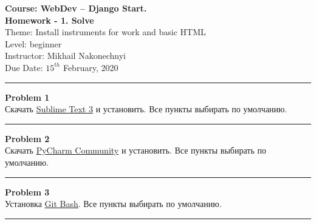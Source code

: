 \documentclass[a4paper, 11pt]{extarticle}
\newenvironment{problem}[2][Problem]
    { \begin{mdframed}[backgroundcolor=gray!20] \textbf{#1 #2} \\}
    {  \end{mdframed}}
\begin{document}

\noindent \LARGE{\textbf{Course: WebDev -- Django Start.}} \hfill  \\ 
\textbf{Homework - 1. Solve}  \hfill  \\

\noindent Theme: Install instruments for work and basic HTML\hfill  \\
Level: beginner\\
Instructor: Mikhail Nakonechnyi \\
Due Date: $15^{th}$ February, 2020 \\
\noindent\rule{6.257in}{2.8pt}

\begin{problem}{1}
Скачать \href{https://www.sublimetext.com/3}{Sublime Text 3} и установить. Все пункты выбирать по умолчанию.
\end{problem}

\noindent\rule{6.257in}{2.8pt}



\begin{problem}{2}
Скачать \href{https://www.jetbrains.com/pycharm/download/#section=windows}{PyCharm Community} и установить. Все пункты выбирать по умолчанию.
\end{problem}

\noindent\rule{6.257in}{2.8pt}


\begin{problem}{3}
Установка \href{https://git-scm.com/downloads}{Git Bash}. Все пункты выбирать по умолчанию.
\end{problem}

\noindent\rule{6.257in}{2.8pt}



\end{document}
